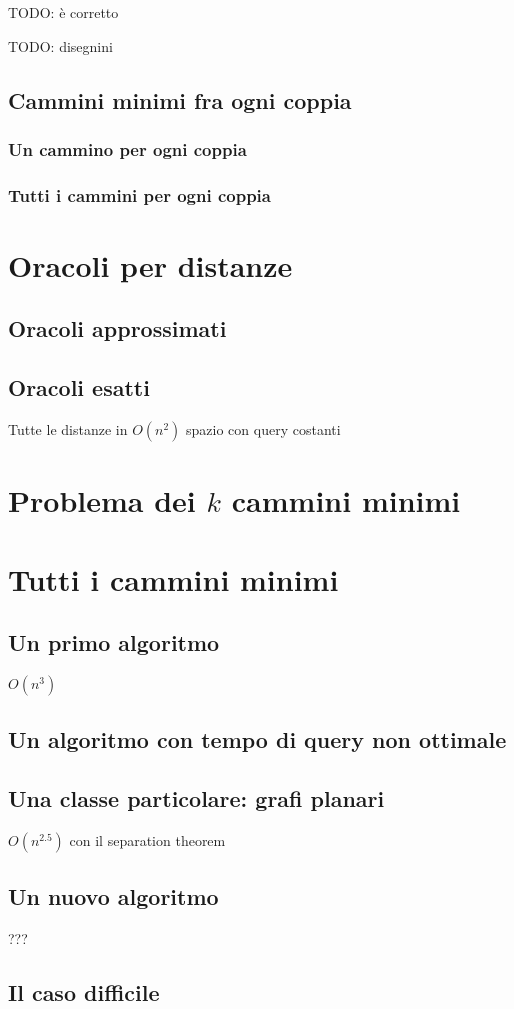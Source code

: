 \documentclass[a4paper,10pt]{amsbook}
\theoremstyle{plain}
\theoremstyle{definition}
\theoremstyle{remark}
\begin{document}
TODO: è corretto

TODO: disegnini

\section{Cammini minimi fra ogni coppia}

\subsection{Un cammino per ogni coppia}

\subsection{Tutti i cammini per ogni coppia}

\chapter{Oracoli per distanze}

\section{Oracoli approssimati}

\section{Oracoli esatti}

Tutte le distanze in $O(n^2)$ spazio con query costanti




\chapter{Problema dei $k$ cammini minimi}



\chapter{Tutti i cammini minimi}

\section{Un primo algoritmo}

$O(n^3)$

\section{Un algoritmo con tempo di query non ottimale}


\section{Una classe particolare: grafi planari}

$O(n^{2.5})$ con il separation theorem

\section{Un nuovo algoritmo}

???

\section{Il caso difficile}
\end{document}
